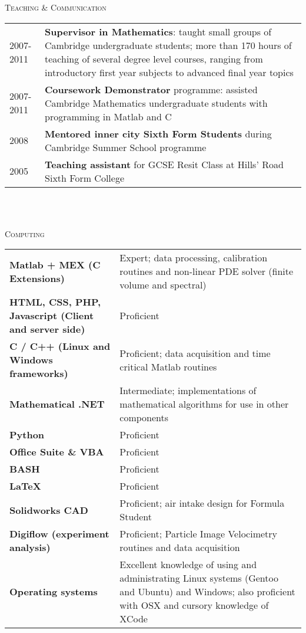 \documentclass[a4paper,10pt]{article}
\newcommand{\lineunder}{\vspace*{0.2cm} \\ \hspace*{-20pt} \hrulefill \\ \vspace{-0.9cm}}
\newcommand{\header}[1]{{\hspace*{-17pt}\vspace*{6pt} \large{\textsc{#1}}}}
\begin{document}
\header{Teaching  \& Communication}

\begin{tabular}{p{0.8in}p{5.3in}}
2007-2011 & \textbf{Supervisor in Mathematics}: taught small groups of Cambridge undergraduate students; more than 170 hours of teaching of several degree level courses, ranging from introductory first year subjects to advanced final year topics \\ 
2007-2011 & \textbf{Coursework Demonstrator} programme: assisted Cambridge Mathematics undergraduate students with programming in Matlab and C\\
2008      & \textbf{Mentored inner city Sixth Form Students} during Cambridge Summer School programme \\
2005      & \textbf{Teaching assistant} for GCSE Resit Class at Hills' Road Sixth Form College \\ 
\end{tabular}
\newline
\lineunder

\header{Computing}

\begin{tabular}{p{2.8in}p{3.3in}}
\textbf{Matlab + MEX (C Extensions)} & Expert; data processing, calibration routines and non-linear PDE solver (finite volume and spectral)\\
\textbf{HTML, CSS, PHP, Javascript (Client and server side)} & Proficient\\
\textbf{C / C++ (Linux and Windows frameworks)}     & Proficient; data acquisition and time critical Matlab routines\\
\textbf{Mathematical .NET} & Intermediate; implementations of mathematical algorithms for use in other components\\
\textbf{Python} & Proficient\\
\textbf{Office Suite \& VBA} & Proficient\\
\textbf{BASH}   & Proficient\\
\textbf{\LaTeX} & Proficient\\
\textbf{Solidworks CAD} & Proficient; air intake design for Formula Student \\
\textbf{Digiflow (experiment analysis)} & Proficient; Particle Image Velocimetry routines and data acquisition\\
\textbf{Operating systems} & Excellent knowledge of using and administrating Linux systems (Gentoo and Ubuntu) and  Windows; also proficient with OSX and cursory knowledge of XCode \\
\end{tabular}
\newline
\lineunder
\end{document}
